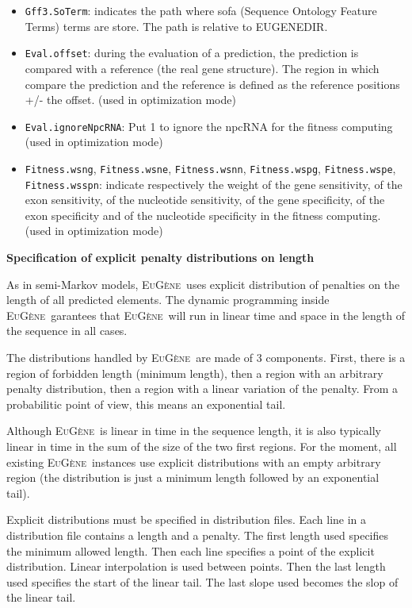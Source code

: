 \documentclass[a4paper,titlepage]{report}
\newcommand{\EuGene}{\textsc{EuG\`ene}}
\begin{document}
\begin{itemize}
\item \texttt{Gff3.SoTerm}: indicates the path where sofa (Sequence Ontology Feature Terms) terms are store.
  The path is relative to EUGENEDIR.

\item \texttt{Eval.offset}: during the evaluation of a prediction, the prediction is compared with a 
reference (the real gene structure). The region in which compare the prediction 
and the reference is defined as the reference positions +/- the offset.
(used in optimization mode)

\item \texttt{Eval.ignoreNpcRNA}: Put 1 to ignore the npcRNA 
for the fitness computing (used in optimization mode)

\item \texttt{Fitness.wsng}, \texttt{Fitness.wsne}, 
\texttt{Fitness.wsnn}, \texttt{Fitness.wspg}, 
\texttt{Fitness.wspe}, \texttt{Fitness.wsspn}: indicate respectively the weight 
of the gene sensitivity, of the exon sensitivity, 
of the nucleotide sensitivity, of the gene specificity, of the exon specificity 
and of the nucleotide specificity in the fitness computing. (used in optimization mode)
\end{itemize}

{\bf Specification of explicit penalty distributions on length}

As in semi-Markov models, \EuGene\ uses explicit distribution of
penalties on the length of all predicted elements. The dynamic
programming inside \EuGene\ garantees that \EuGene\ will run in linear
time and space in the length of the sequence in all cases.

The distributions handled by \EuGene\ are made of 3 components. First,
there is a region of forbidden length (minimum length), then a region
with an arbitrary penalty distribution, then a region with a linear
variation of the penalty. From a probabilitic point of view, this means
an exponential tail.

Although \EuGene\ is linear in time in the sequence length, it is also
typically linear in time in the sum of the size of the two first
regions. For the moment, all existing \EuGene\ instances use explicit
distributions with an empty arbitrary region (the distribution is just
a minimum length followed by an exponential tail).

Explicit distributions must be specified in distribution files. Each
line in a distribution file contains a length and a penalty. The first
length used specifies the minimum allowed length. Then each line
specifies a point of the explicit distribution. Linear interpolation
is used between points. Then the last length used specifies the start
of the linear tail. The last slope used becomes the slop of the linear
tail.
\end{document}

